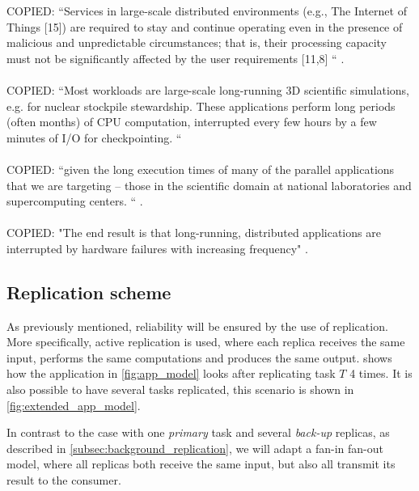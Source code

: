 \documentclass{cslthse-msc}
\begin{document}
COPIED:
“Services in large-scale distributed environments (e.g., The Internet of Things [15]) are required to stay and continue operating even in the presence of malicious and unpredictable circumstances; that is, their processing capacity must not be significantly affected by the user requirements [11,8] “ \cite{imprRelAdaptRL}.
\\\\
COPIED: “Most workloads are large-scale long-running 3D scientific simulations, e.g. for nuclear stockpile stewardship. These applications perform long periods (often months) of CPU computation, interrupted every few hours by a few minutes of I/O for checkpointing. “ \cite{studyOfFailures}
\\\\
COPIED: “given the long execution times of many of the parallel applications that we are targeting – those in the scientific domain at national laboratories and supercomputing centers. “ \cite{implicationsOfFailures}. 
\\\\
COPIED: "The end result is that long-running, distributed applications are interrupted by hardware failures with increasing frequency" \cite{surveyFaultParallel}.

\fi

\subsection{Replication scheme} \label{subsec:design_repl_scheme}
As previously mentioned, reliability will be ensured by the use of replication. More specifically, active replication is used, where each replica receives the same input, performs the same computations and produces the same output.  shows how the application in \cref{fig:app_model} looks after replicating task $T$ 4 times. It is also possible to have several tasks replicated, this scenario is shown in \cref{fig:extended_app_model}.

In contrast to the case with one \emph{primary} task and several \emph{back-up} replicas, as described in \cref{subsec:background_replication}, we will adapt a fan-in fan-out model, where all replicas both receive the same input, but also all transmit its result to the consumer. %
\end{document}

